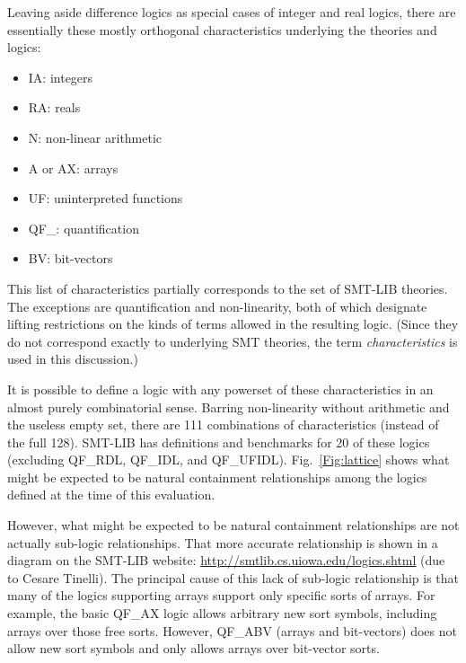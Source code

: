 \documentclass{eptcs}
\begin{document}
Leaving aside difference logics as special cases of integer and real logics, there are essentially these mostly orthogonal characteristics underlying the theories and logics:
\begin{itemize}[noitemsep,nolistsep] %
\item IA: integers 
\item RA: reals
\item N: non-linear arithmetic
\item A or AX: arrays
\item UF: uninterpreted functions
\item QF\_: quantification
\item BV: bit-vectors
\end{itemize}
This list of characteristics partially corresponds to the set of SMT-LIB theories. The exceptions are quantification and non-linearity, both of which designate lifting restrictions on the kinds of terms allowed in the resulting logic. (Since they do not correspond exactly to underlying SMT theories, the term {\em characteristics} is used in this discussion.)

It is possible to define a logic with any powerset of these characteristics in an almost purely combinatorial sense. 
Barring non-linearity without arithmetic and the useless empty set, there are 111 combinations of characteristics (instead of the full 128). SMT-LIB has definitions and benchmarks for 20 of these logics (excluding QF\_RDL, QF\_IDL, and QF\_UFIDL). Fig.~\ref{Fig:lattice} shows what might be expected to be natural containment relationships among the logics defined at the time of this evaluation. 

However, what might be expected to be natural containment relationships are not actually sub-logic relationships. That more accurate relationship is shown in a diagram on the SMT-LIB website: \url{http://smtlib.cs.uiowa.edu/logics.shtml} (due to Cesare Tinelli). The principal cause of this lack of sub-logic relationship is that many of the logics supporting arrays support only specific sorts of arrays. For example, the basic QF\_AX logic allows arbitrary new sort symbols, including arrays over those free sorts. However, QF\_ABV (arrays and bit-vectors) does not allow new sort symbols and only allows arrays over bit-vector sorts.
\end{document}
